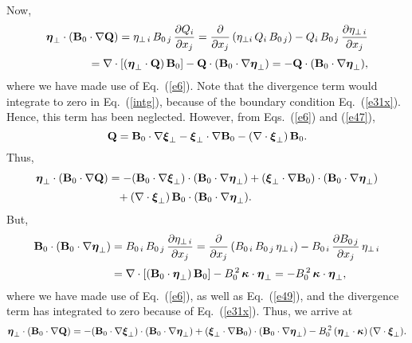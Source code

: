 \documentclass[12pt,prb,aps,notitlepage]{revtex4-1}
\newcommand{\bxi}{\mbox{\boldmath$\xi$}}
\newcommand{\bta}{\mbox{\boldmath$\eta$}}
\newcommand{\bkappa}{\mbox{\boldmath$\kappa$}}
\begin{document}
Now,
\begin{align}
\bta_\perp\cdot({\bf B}_0\cdot\nabla{\bf Q}) 
= \eta_{\perp\,i}\,B_{0\,j}\,\frac{\partial Q_i}{\partial x_j}=
\frac{\partial}{\partial x_j}\,(\eta_{\perp i}\,Q_i\,B_{0\,j})
- Q_i\,B_{0\,j}\,\frac{\partial\eta_{\perp\,i}}{\partial x_j}\nonumber\\[0.5ex]
= \nabla\cdot[(\bta_\perp\cdot {\bf Q})\,{\bf B}_0] - {\bf Q}\cdot ({\bf B}_0\cdot\nabla \bta_\perp)=- {\bf Q}\cdot ({\bf B}_0\cdot\nabla \bta_\perp),
\end{align}
where we have  made use of  Eq.~(\ref{e6}). Note that the divergence term would integrate to zero in Eq.~(\ref{intg}),  because of the boundary condition Eq.~(\ref{e31x}). 
Hence, this term has been neglected. 
However, from Eqs.~(\ref{e6}) and (\ref{e47}),
\begin{equation}\label{e53}
{\bf Q}  ={\bf B}_0\cdot\nabla \bxi_\perp - \bxi_\perp\cdot\nabla {\bf B}_0 - (\nabla\cdot\bxi_\perp)\,{\bf B}_0.
\end{equation}
Thus,
\begin{align}
\bta_\perp \cdot({\bf B}_0\cdot\nabla {\bf Q})&=- ({\bf B}_0\cdot\nabla\bxi_\perp)\cdot({\bf B}_0\cdot\nabla \bta_\perp)+ (\bxi_\perp\cdot\nabla {\bf B}_0)\cdot({\bf B}_0\cdot\nabla \bta_\perp) \nonumber\\[0.5ex]
&\phantom{=}+ (\nabla\cdot\bxi_\perp)\,{\bf B}_0\cdot({\bf B}_0\cdot\nabla \bta_\perp). 
\end{align}
But,
\begin{align}
{\bf B}_0\cdot({\bf B}_0\cdot\nabla \bta_\perp)&= B_{0\,i}\,B_{0\,j}\,\frac{\partial \eta_{\perp\,i}}{\partial x_j}= \frac{\partial}{\partial x_j}\,( B_{0\,i}\,B_{0\,j}\, \eta_{\perp\,i}) - B_{0\,i}\,\frac{\partial B_{0\,j}}{\partial x_j}\,\eta_{\perp\,i}\nonumber\\[0.5ex]
&= \nabla\cdot [({\bf B}_0\cdot\bta_\perp)\,{\bf B}_0] -B_0^{\,2}\,\bkappa\cdot \bta_\perp=-B_0^{\,2}\,\bkappa\cdot \bta_\perp,
\end{align}
where we have made use of Eq.~(\ref{e6}), as well as Eq.~(\ref{e49}), and the divergence term has integrated to zero because of Eq.~(\ref{e31x}). Thus, we arrive at
\begin{equation}\label{e56}
\bta_\perp \cdot({\bf B}_0\cdot\nabla {\bf Q})=- ({\bf B}_0\cdot\nabla\bxi_\perp)\cdot({\bf B}_0\cdot\nabla \bta_\perp)+ (\bxi_\perp\cdot\nabla {\bf B}_0)\cdot({\bf B}_0\cdot\nabla \bta_\perp) - B_0^{\,2}\,(\bta_\perp\cdot\bkappa)\,(\nabla\cdot\bxi_\perp).
\end{equation}
\end{document}
